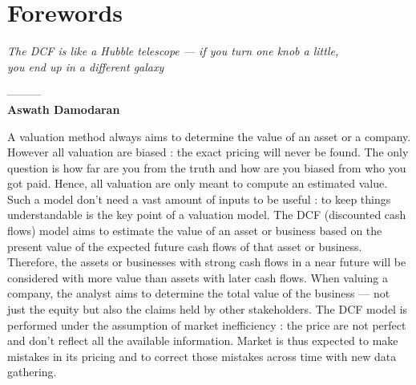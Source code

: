 










\newpage
\onehalfspacing


\newlength{\cftparagraphindent}
\setlength{\cftparagraphindent}{110pt} %
\newlength{\cftparagraphnumwidth}
\setlength{\cftparagraphnumwidth}{4.6em} %



\tableofcontents

\newpage




\chapter*{Forewords}




\begin{center}
    \textit{The DCF is like a Hubble telescope — if you turn one knob a little,\\ you end up in a different galaxy} 

    ---------\\
    \textbf{Aswath Damodaran}
\end{center}

\vfill

\lettrine{A}{} valuation method always aims to determine the value of an asset or a company. However all valuation are biased : the exact pricing will never be found. The only question is how far are you from the truth and how are you biased from who you got paid. Hence, all valuation are only meant to compute an estimated value. Such a model don't need a vast amount of inputs to be useful : to keep things understandable is the key point of a valuation model. The DCF (discounted cash flows) model aims to estimate the value of an asset or business based on the present value of the expected future cash flows of that asset or business. Therefore, the assets or businesses with strong cash flows in a near future will be considered with more value than assets with later cash flows. When valuing a company, the analyst aims to determine the total value of the business — not just the equity but also the claims held by other stakeholders. The DCF model is performed under the assumption of market inefficiency : the price are not perfect and don't reflect all the available information. Market is thus expected to make mistakes in its pricing and to correct those mistakes across time with new data gathering. 





